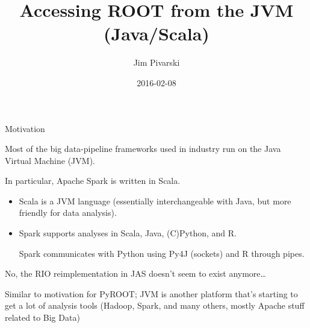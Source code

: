 \documentclass{beamer}
\title[2016-02-08-ROOT-JVM-firsttalk]{Accessing ROOT from the JVM (Java/Scala)}
\author{Jim Pivarski}
\date{2016-02-08}
\begin{document}
\begin{frame}
  \titlepage
\end{frame}


\begin{frame}{Motivation}
\begin{block}{}
Most of the big data-pipeline frameworks used in industry run on the Java Virtual Machine (JVM).
\end{block}

\begin{block}{}
In particular, Apache Spark is written in Scala.
\begin{itemize}
\item Scala is a JVM language (essentially interchangeable with Java, but more friendly for data analysis).
\item Spark supports analyses in Scala, Java, (C)Python, and R.

Spark communicates with Python using Py4J (sockets) and R through pipes.



\end{itemize}
\end{block}





No, the RIO reimplementation in JAS doesn't seem to exist anymore\ldots

Similar to motivation for PyROOT; JVM is another platform that's starting to get a lot of analysis tools (Hadoop, Spark, and many others, mostly Apache stuff related to Big Data)
\end{frame}
\end{document}
